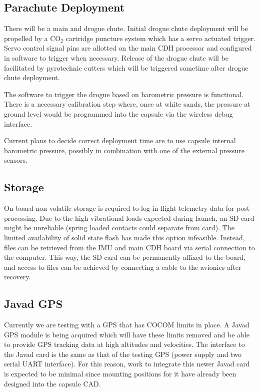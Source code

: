 \documentclass{article}
\begin{document}
\subsection{Parachute Deployment}
There will be a main and drogue chute. Initial drogue chute deployment will be propelled by a CO$_2$ cartridge puncture system which has a servo actuated trigger. Servo control signal pins are allotted on the main CDH processor and configured in software to trigger when necessary. Release of the drogue chute will be facilitated by pyrotechnic cutters which will be triggered sometime after drogue chute deployment.

The software to trigger the drogue based on barometric pressure is functional. There is a necessary calibration step where, once at white sands, the pressure at ground level would be programmed into the capsule via the wireless debug interface.

Current plans to decide correct deployment time are to use capsule internal barometric pressure, possibly in combination with one of the external pressure sensors.


\subsection{Storage}
On board non-volatile storage is required to log in-flight telemetry data for post processing. Due to the high vibrational loads expected during launch, an SD card might be unreliable (spring loaded contacts could separate from card). The limited availability of solid state flash has made this option infeasible. Instead, files can be retrieved from the IMU and main CDH board via serial connection to the computer. This way, the SD card can be permanently affixed to the board, and access to files can be achieved by connecting a cable to the avionics after recovery.

\subsection{Javad GPS}
Currently we are testing with a GPS that has COCOM limits in place. A Javad GPS module is being acquired which will have these limits removed and be able to provide GPS tracking data at high altitudes and velocities. The interface to the Javad card is the same as that of the testing GPS (power supply and two serial UART interface). For this reason, work to integrate this newer Javad card is expected to be minimal since mounting positions for it have already been designed into the capsule CAD.
\end{document}
